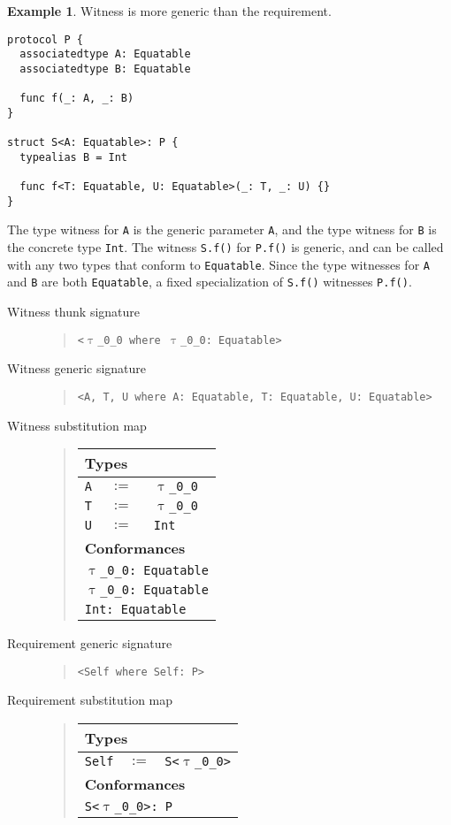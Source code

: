 \documentclass[a4paper,headsepline,bibliography=totoc,toc=flat,fleqn,twoside=semi]{scrbook}
\theoremstyle{definition}
\theoremstyle{definition}
\newtheorem{example}{Example}[chapter]
\theoremstyle{definition}
\newcommand{\ttgp}[2]{\texttt{$\uptau$\_#1\_#2}}
\newcommand{\SubMapC}[2]{\begin{tabular}{|lll|}
\hline
\multicolumn{3}{|l|}{\textbf{Types}}\\
\hline
#1\\
\hline
\hline
\multicolumn{3}{|l|}{\textbf{Conformances}}\\
\hline
#2\\
\hline
\end{tabular}}
\newcommand{\SubType}[2]{\texttt{#1}&$:=$&\texttt{#2}}
\newcommand{\SubConf}[1]{\multicolumn{3}{|l|}{\texttt{#1}}}
\begin{document}
\begin{example} Witness is more generic than the requirement.
\begin{Verbatim}
protocol P {
  associatedtype A: Equatable
  associatedtype B: Equatable

  func f(_: A, _: B)
}

struct S<A: Equatable>: P {
  typealias B = Int

  func f<T: Equatable, U: Equatable>(_: T, _: U) {}
}
\end{Verbatim}
The type witness for \texttt{A} is the generic parameter \texttt{A}, and the type witness for \texttt{B} is the concrete type \texttt{Int}.
The witness \texttt{S.f()} for \texttt{P.f()} is generic, and can be called with any two types that conform to \texttt{Equatable}. Since the type witnesses for \texttt{A} and \texttt{B} are both \texttt{Equatable}, a fixed specialization of \texttt{S.f()} witnesses \texttt{P.f()}.

\begin{description}
\item[Witness thunk signature] \vphantom{a}
\begin{quote}
\texttt{<\ttgp{0}{0} where \ttgp{0}{0}:\ Equatable>}
\end{quote}
\item[Witness generic signature] \vphantom{a}
\begin{quote}
\texttt{<A, T, U where A:\ Equatable, T:\ Equatable, U:\ Equatable>}
\end{quote}
\item[Witness substitution map] \vphantom{a}
\begin{quote}
\SubMapC{
\SubType{A}{\ttgp{0}{0}}\\
\SubType{T}{\ttgp{0}{0}}\\
\SubType{U}{Int}
}{
\SubConf{\ttgp{0}{0}:\ Equatable}\\
\SubConf{\ttgp{0}{0}:\ Equatable}\\
\SubConf{Int:\ Equatable}
}
\end{quote}

\item[Requirement generic signature]  \vphantom{a}
\begin{quote}
\texttt{<Self where Self:\ P>}
\end{quote}
\item[Requirement substitution map] \phantom{a}
\begin{quote}
\SubMapC{
\SubType{Self}{S<\ttgp{0}{0}>}
}{
\SubConf{S<\ttgp{0}{0}>:\ P}
}
\end{quote}
\end{description}
\end{example}
\end{document}
